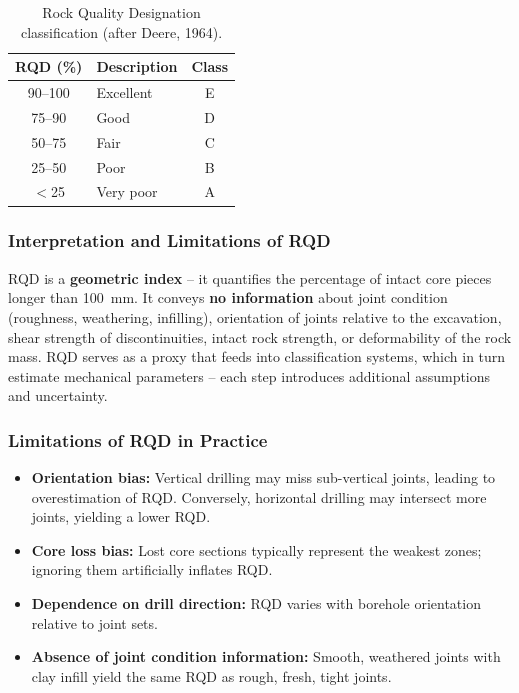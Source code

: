 \documentclass[a4paper,12pt]{article}
\begin{document}
\begin{table}[h!]
\centering
\begin{tabular}{clc}
\toprule
\textbf{RQD (\%)} & \textbf{Description} & \textbf{Class} \\
\midrule
90--100 & Excellent & E \\
75--90  & Good    & D \\
50--75  & Fair    & C \\
25--50  & Poor    & B \\
$<$25    & Very poor & A \\
\bottomrule
\end{tabular}
\caption{Rock Quality Designation classification (after Deere, 1964).}
\label{tab:rqd}
\end{table}

\subsubsection{Interpretation and Limitations of RQD}

\begin{warnbox}
RQD is a \textbf{geometric index} -- it quantifies the percentage of intact core pieces longer than 100~mm. It conveys \textbf{no information} about joint condition (roughness, weathering, infilling), orientation of joints relative to the excavation, shear strength of discontinuities, intact rock strength, or deformability of the rock mass. RQD serves as a proxy that feeds into classification systems, which in turn estimate mechanical parameters -- each step introduces additional assumptions and uncertainty.
\end{warnbox}

\subsubsection{Limitations of RQD in Practice}
\begin{itemize}
    \item \textbf{Orientation bias:} Vertical drilling may miss sub-vertical joints, leading to overestimation of RQD. Conversely, horizontal drilling may intersect more joints, yielding a lower RQD.
    \item \textbf{Core loss bias:} Lost core sections typically represent the weakest zones; ignoring them artificially inflates RQD.
    \item \textbf{Dependence on drill direction:} RQD varies with borehole orientation relative to joint sets.
    \item \textbf{Absence of joint condition information:} Smooth, weathered joints with clay infill yield the same RQD as rough, fresh, tight joints.
\end{itemize}
\end{document}
